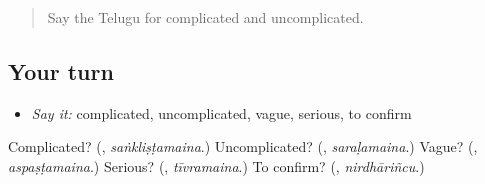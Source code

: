 \label{lesson:TE-R437-review-final-437}



\begin{quote}
Say the Telugu for complicated and uncomplicated.
\end{quote}

\subsection*{Your turn}
\begin{itemize}
\raggedright
  \item \emph{Say it:} complicated, uncomplicated, vague, serious, to confirm
\end{itemize}

\begin{tcolorbox}[breakable,colback=teal!4,colframe=teal!35!black,title={Before you move on}]
Complicated? (\textbf{}, \emph{saṅkliṣṭamaina}.) Uncomplicated? (\textbf{}, \emph{saraḷamaina}.) Vague? (\textbf{}, \emph{aspaṣṭamaina}.) Serious? (\textbf{}, \emph{tīvramaina}.) To confirm? (\textbf{}, \emph{nirdhāriñcu}.)
\end{tcolorbox}
